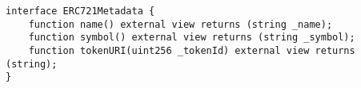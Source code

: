 \begin{lstlisting}[language=Solidity]
interface ERC721Metadata {
    function name() external view returns (string _name);
    function symbol() external view returns (string _symbol);
    function tokenURI(uint256 _tokenId) external view returns (string);
}
\end{lstlisting}